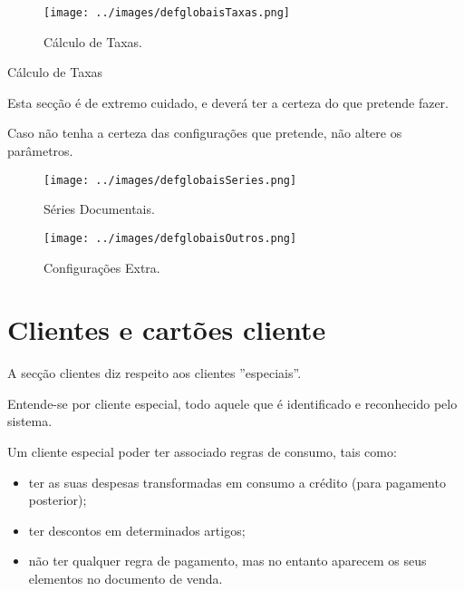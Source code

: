 \documentclass[a4paper,11pt,openany]{memoir}
\newcommand\perigo{\texttt{[image: ../small-n-flat-master/png/96/shield-warning.png]}}
\newcommand{\bcperigo}[2]{\vspace{5mm}\begin{bclogo}[couleur=red!30,logo=\perigo]{\hspace{0.7cm}#1}{#2}\end{bclogo}}
\begin{document}
\begin{figure}[h]
\begin{center}
\texttt{[image: ../images/defglobaisTaxas.png]}
\caption[Submanifold]{Cálculo de Taxas.}
\label{defglobaisTaxas}
\end{center}
\end{figure}

\bcperigo{Cálculo de Taxas}
{Esta secção é de extremo cuidado, e deverá ter a certeza do que 
pretende fazer. 

Caso não tenha a certeza das configurações que pretende, não altere os parâmetros.} 

\begin{figure}[h]
\begin{center}
\texttt{[image: ../images/defglobaisSeries.png]}
\caption[Submanifold]{Séries Documentais.}
\label{defglobaisSeries}
\end{center}
\end{figure}

\begin{figure}[h]
\begin{center}
\texttt{[image: ../images/defglobaisOutros.png]}
\caption[Submanifold]{Configurações Extra.}
\label{defglobaisOutros}
\end{center}
\end{figure}











\chapter{Clientes e cartões cliente}



A secção clientes diz respeito aos clientes ''especiais''. 

Entende-se por cliente especial, todo aquele que é identificado e reconhecido pelo sistema. 

Um cliente especial poder ter associado regras de consumo, tais como:
\begin{itemize}
\item ter as suas despesas transformadas em consumo a crédito (para pagamento posterior);
\item ter descontos em determinados artigos;
\item não ter qualquer regra de pagamento, mas no entanto aparecem os seus elementos no documento de venda.
\end{itemize}
\end{document}
